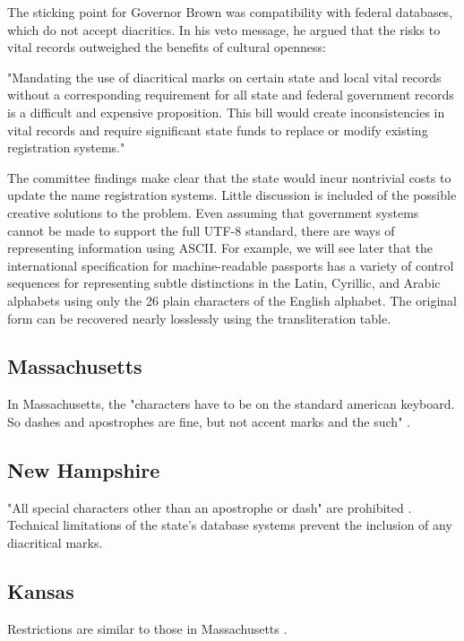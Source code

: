 The sticking point for Governor Brown was compatibility with federal databases,
which do not accept diacritics. In his veto message, he argued that the risks to
vital records outweighed the benefits of cultural openness:

"Mandating the use of diacritical marks on certain state and local vital records
without a corresponding requirement for all state and federal government records
is a difficult and expensive proposition. This bill would create
inconsistencies in vital records and require significant state funds to replace
or modify existing registration systems."

The committee findings make clear that the state would incur nontrivial costs to
update the name registration systems. Little discussion is included of the
possible creative solutions to the problem. Even assuming that government
systems cannot be made to support the full UTF-8 standard, there are ways of
representing information using ASCII. For example, we will see later that the
international specification for machine-readable passports has a variety of
control sequences for representing subtle distinctions in the Latin, Cyrillic,
and Arabic alphabets using only the 26 plain characters of the English alphabet.
The original form can be recovered nearly losslessly using the transliteration
table.

\subsection{Massachusetts}

In Massachusetts, the "characters have to be on the standard american keyboard.
So dashes and apostrophes are fine, but not accent marks and the such"
\parencite{larson11}.

\subsection{New Hampshire}

"All special characters other than an apostrophe or dash" are prohibited
\parencite{larson11}. Technical limitations of the state's database systems
prevent the inclusion of any diacritical marks.

\subsection{Kansas}

Restrictions are similar to those in Massachusetts \parencite{larson11}.
